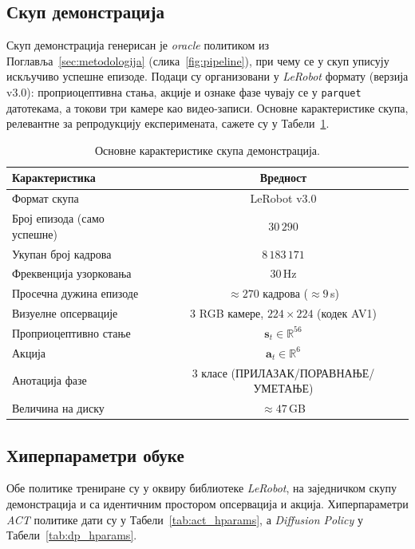 \documentclass[12pt, a4paper]{article}
\begin{document}
\subsection{Скуп демонстрација}
\label{subsec:skup_demonstracija}

Скуп демонстрација генерисан је \textit{oracle} политиком из Поглавља~\ref{sec:metodologija} (слика~\ref{fig:pipeline}), при чему се у скуп уписују искључиво успешне епизоде.
Подаци су организовани у \textit{LeRobot} формату (верзија v3.0): проприоцептивна стања, акције и ознаке фазе чувају се у \texttt{parquet} датотекама, а токови три камере као видео-записи.
Основне карактеристике скупа, релевантне за репродукцију експеримената, сажете су у Табели~\ref{tab:dataset}.

\begin{table}[htbp]
    \caption{Основне карактеристике скупа демонстрација.}
    \label{tab:dataset}
    \centering
    \begin{tabular}{l c}
        \toprule
        Карактеристика & Вредност \\
        \midrule
        Формат скупа & LeRobot v3.0 \\
        Број епизода (само успешне) & $30\,290$ \\
        Укупан број кадрова & $8\,183\,171$ \\
        Фреквенција узорковања & $30$\,Hz \\
        Просечна дужина епизоде & $\approx 270$ кадрова ($\approx 9$\,s) \\
        Визуелне опсервације & 3 RGB камере, $224\times 224$ (кодек AV1) \\
        Проприоцептивно стање & $\mathbf{s}_t \in \mathbb{R}^{56}$ \\
        Акција & $\mathbf{a}_t \in \mathbb{R}^{6}$ \\
        Анотација фазе & 3 класе (ПРИЛАЗАК/ПОРАВНАЊЕ/УМЕТАЊЕ) \\
        Величина на диску & $\approx 47$\,GB \\
        \bottomrule
    \end{tabular}
\end{table}

\subsection{Хиперпараметри обуке}
\label{subsec:hiperparametri}

Обе политике трениране су у оквиру библиотеке \textit{LeRobot}, на заједничком скупу демонстрација и са идентичним простором опсервација и акција.
Хиперпараметри \textit{ACT} политике дати су у Табели~\ref{tab:act_hparams}, а \textit{Diffusion Policy} у Табели~\ref{tab:dp_hparams}.
\end{document}
